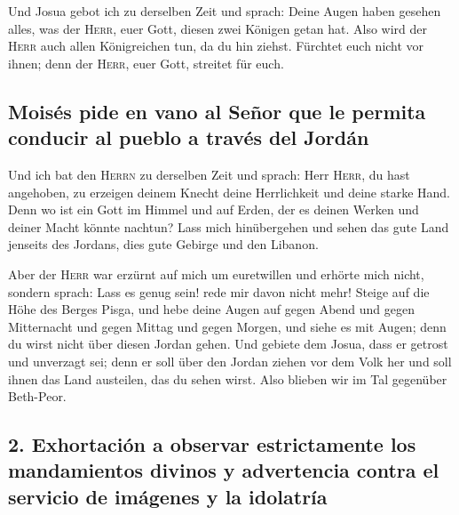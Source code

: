  Und Josua gebot ich zu derselben Zeit und sprach: Deine
Augen haben gesehen alles, was der \textsc{Herr}, euer Gott, diesen zwei
Königen getan hat. Also wird der \textsc{Herr} auch allen Königreichen
tun, da du hin ziehst.  Fürchtet euch nicht vor ihnen;
denn der \textsc{Herr}, euer Gott, streitet für euch.

\hypertarget{moisuxe9s-pide-en-vano-al-seuxf1or-que-le-permita-conducir-al-pueblo-a-travuxe9s-del-jorduxe1n}{%
\subsection{Moisés pide en vano al Señor que le permita conducir al
pueblo a través del
Jordán}\label{moisuxe9s-pide-en-vano-al-seuxf1or-que-le-permita-conducir-al-pueblo-a-travuxe9s-del-jorduxe1n}}

 Und ich bat den \textsc{Herrn} zu derselben Zeit und
sprach:  Herr \textsc{Herr}, du hast angehoben, zu
erzeigen deinem Knecht deine Herrlichkeit und deine starke Hand. Denn wo
ist ein Gott im Himmel und auf Erden, der es deinen Werken und deiner
Macht könnte nachtun?  Lass mich hinübergehen und sehen
das gute Land jenseits des Jordans, dies gute Gebirge und den Libanon.

 Aber der \textsc{Herr} war erzürnt auf mich um
euretwillen und erhörte mich nicht, sondern sprach: Lass es genug sein!
rede mir davon nicht mehr!  Steige auf die Höhe des
Berges Pisga, und hebe deine Augen auf gegen Abend und gegen Mitternacht
und gegen Mittag und gegen Morgen, und siehe es mit Augen; denn du wirst
nicht über diesen Jordan gehen.  Und gebiete dem Josua,
dass er getrost und unverzagt sei; denn er soll über den Jordan ziehen
vor dem Volk her und soll ihnen das Land austeilen, das du sehen wirst.
 Also blieben wir im Tal gegenüber Beth-Peor.

\hypertarget{exhortaciuxf3n-a-observar-estrictamente-los-mandamientos-divinos-y-advertencia-contra-el-servicio-de-imuxe1genes-y-la-idolatruxeda}{%
\subsection{2. Exhortación a observar estrictamente los mandamientos
divinos y advertencia contra el servicio de imágenes y la
idolatría}\label{exhortaciuxf3n-a-observar-estrictamente-los-mandamientos-divinos-y-advertencia-contra-el-servicio-de-imuxe1genes-y-la-idolatruxeda}}

